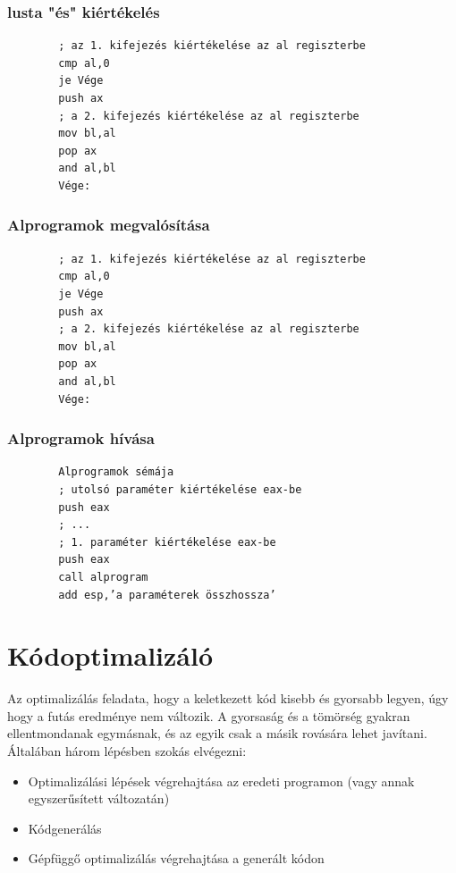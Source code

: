 \documentclass[margin=0px]{article}
\begin{document}
\subsubsection{ lusta "és" kiértékelés }
	
	\begin{verbatim}
		; az 1. kifejezés kiértékelése az al regiszterbe
		cmp al,0
		je Vége
		push ax
		; a 2. kifejezés kiértékelése az al regiszterbe
		mov bl,al
		pop ax
		and al,bl
		Vége:
	\end{verbatim}
	

\subsubsection{ Alprogramok megvalósítása }
	
	
	\begin{verbatim}
		; az 1. kifejezés kiértékelése az al regiszterbe
		cmp al,0
		je Vége
		push ax
		; a 2. kifejezés kiértékelése az al regiszterbe
		mov bl,al
		pop ax
		and al,bl
		Vége:
	\end{verbatim}
	
\subsubsection{ Alprogramok hívása }

	\begin{verbatim}
		Alprogramok sémája
		; utolsó paraméter kiértékelése eax-be
		push eax
		; ...
		; 1. paraméter kiértékelése eax-be
		push eax
		call alprogram
		add esp,’a paraméterek összhossza’
	\end{verbatim}
	
\section{Kódoptimalizáló}
	
	Az optimalizálás feladata, hogy a keletkezett kód kisebb és gyorsabb legyen, úgy hogy a futás eredménye nem változik. A gyorsaság és a tömörség gyakran ellentmondanak egymásnak, és az egyik csak a másik rovására lehet javítani. Általában három lépésben szokás elvégezni:
	
	\begin{itemize}
		\item 
		Optimalizálási lépések végrehajtása az eredeti programon (vagy annak egyszerűsített változatán)
		\item 
		Kódgenerálás
		\item 
		Gépfüggő optimalizálás végrehajtása a generált kódon
	\end{itemize}
	
\end{document}
